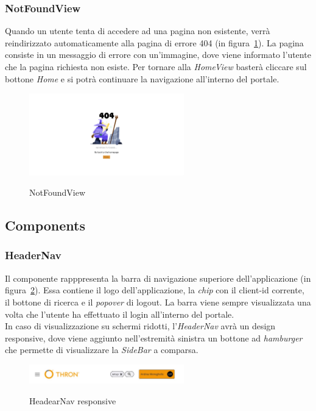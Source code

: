 \subsubsection{NotFoundView}\label{subsubsec:not-found-view}
Quando un utente tenta di accedere ad una pagina non esistente, verrà reindirizzato automaticamente alla pagina di errore 404 (in figura~\ref{fig:not-found-view}).
La pagina consiste in un messaggio di errore con un'immagine, dove viene informato l'utente che la pagina richiesta non esiste.
Per tornare alla \textit{HomeView} basterà cliccare sul bottone \textit{Home} e si potrà continuare la navigazione all'interno del portale.

\begin{figure}[ht]
  \centering
  \includegraphics[width=0.6\textwidth, alt={Pagina di errore 404}]{images/frontend/NotFoundView.jpg}
  \caption{NotFoundView}\label{fig:not-found-view}
\end{figure}
\pagebreak
\subsection{Components}\label{subsec:components}

\subsubsection{HeaderNav}\label{subsubsec:header-nav}
Il componente rapppresenta la barra di navigazione superiore dell'applicazione (in figura~\ref{fig:header-nav-responsive}). Essa contiene il logo dell'applicazione, la \textit{chip} con il client-id
corrente, il bottone di ricerca e il \textit{popover} di logout. 
La barra viene sempre visualizzata una volta che l'utente ha effettuato il login all'interno del portale.\\
In caso di visualizzazione su schermi ridotti, l'\textit{HeaderNav} avrà un design responsive, dove viene aggiunto nell'estremità sinistra un bottone ad \textit{hamburger}
che permette di visualizzare la \textit{SideBar} a comparsa.

\begin{figure}[ht]
  \centering
  \includegraphics[width=0.6\textwidth, alt={Barra di navigazione superiore con design responsive}]{images/frontend/HeaderRes.jpg}
  \caption{HeadearNav responsive}\label{fig:header-nav-responsive}
\end{figure}

